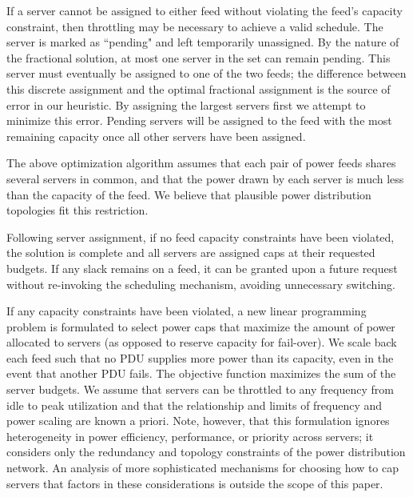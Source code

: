 If a server cannot be assigned to either feed without violating the feed's capacity constraint, then throttling may be necessary to achieve a valid schedule.  The server is marked as ``pending" and left temporarily unassigned. By the nature of the fractional solution, at most one server in the set can remain pending.  This server must eventually be assigned to one of the two feeds; the difference between this discrete assignment and the optimal fractional assignment is the source of error in our heuristic. By assigning the largest servers first we attempt to minimize this error. Pending servers will be assigned to the feed with the most remaining capacity once all other servers have been assigned.

The above optimization algorithm assumes that each pair of power feeds shares several servers in common, and that the power drawn by each server is much less than the capacity of the feed.
We believe that plausible power distribution topologies fit this restriction.

Following server assignment, if no feed capacity constraints have been violated, the solution is complete and all servers are assigned caps at their requested budgets.  If any slack remains on a feed, it can be granted upon a future request without re-invoking the scheduling mechanism, avoiding unnecessary switching. 

If any capacity constraints have been violated, a new linear programming problem is formulated to select power caps that maximize the amount of power allocated to servers (as opposed to reserve capacity for fail-over).  We scale back each feed such that no PDU supplies more power than its capacity, even in the event that another PDU fails.  The objective function maximizes the sum of the server budgets.  We assume that servers can be throttled to any frequency from idle to peak utilization and that the relationship and limits of frequency and power scaling are known a priori.
Note, however, that this formulation ignores heterogeneity in power efficiency, performance, or priority across servers; it considers only the redundancy and topology constraints of the power distribution network.  An analysis of more sophisticated mechanisms for choosing how to cap servers that factors in these considerations is outside the scope of this paper.

